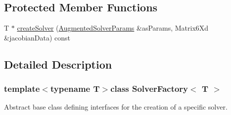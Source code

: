 \subsection*{Protected Member Functions}
\begin{DoxyCompactItemize}
\item 
T $\ast$ \hyperlink{classSolverFactory_a49a73417f779159054fee4f6218ce7c8}{create\-Solver} (\hyperlink{structAugmentedSolverParams}{Augmented\-Solver\-Params} \&as\-Params, Matrix6\-Xd \&jacobian\-Data) const 
\end{DoxyCompactItemize}


\subsection{Detailed Description}
\subsubsection*{template$<$typename T$>$class Solver\-Factory$<$ T $>$}

Abstract base class defining interfaces for the creation of a specific solver. 

